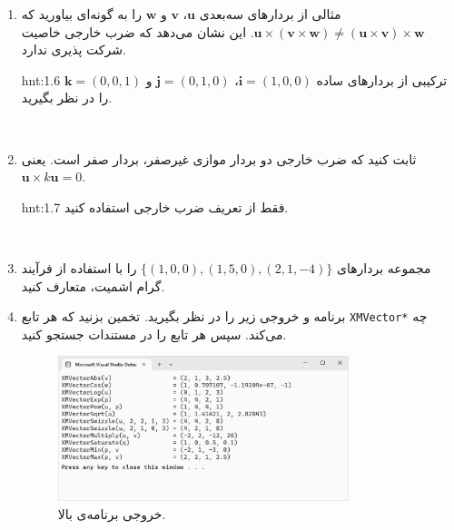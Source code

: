 {\begin{spacing}{1.5}
\begin{enumerate}[label=\textbf{\arabic*}.]
\begin{figure}[H]
                \caption {متوازی الاضلاع توسط دو بردار سه‌بعدی $\textbf{u}$ و $\textbf{v}$. متوازی الاضلاع دارای پایه $\norm{\textbf{v}}$ و ارتفاع $\textbf{h}$ است.}
                \label{fig:4.Session.1.1.21}
            \end{figure}
            \\
            \item {مثالی از بردارهای سه‌بعدی $\textbf{u}$، $\textbf{v}$ و $\textbf{w}$ را به گونه‌ای بیاورید که $\textbf{u}\times(\textbf{v}\times\textbf{w})\neq(\textbf{u}\times\textbf{v})\times\textbf{w}$. این نشان می‌دهد که ضرب خارجی خاصیت شرکت پذیری ندارد.}
            \begin{hint}{hnt:1.6}
                \Large
                ترکیبی از بردارهای ساده $\textbf{i}=(1,0,0)$، $\textbf{j}=(0,1,0)$ و $\textbf{k}=(0,0,1)$ را در نظر بگیرید.
            \end{hint}
            \\
            \item {ثابت کنید که ضرب خارجی دو بردار موازی غیر‌صفر، بردار صفر است. یعنی $\textbf{u}\times k\textbf{u}=0$.}
            \begin{hint}{hnt:1.7}
                \Large
                فقط از تعریف ضرب خارجی استفاده کنید.
            \end{hint}
            \\
            \item {مجموعه بردارهای $\{(1, 0, 0), (1, 5, 0), (2, 1, -4)\}$ را با استفاده از فرآیند گرام اشمیت، متعارف کنید.}
            \\
            \item {برنامه و خروجی زیر را در نظر بگیرید.
            تخمین بزنید که هر تابع \texttt{XMVector*} چه می‌کند. سپس هر تابع را در مستندات  جستجو کنید.}
            \textbf{\vspace{6pt}}
            \lr{}
            \textbf{\vspace{-40pt}}
            \begin{figure}[H]
                \centering
                \setlength{\belowcaptionskip}{-10pt}
                \includegraphics[width=0.8\textwidth]{Images/4/1/4.Session.1.1.22}
                \caption {خروجی برنامه‌ی بالا.}
                \label{fig:4.Session.1.1.22}
            \end{figure}
        \end{enumerate}
    \end{spacing}
}